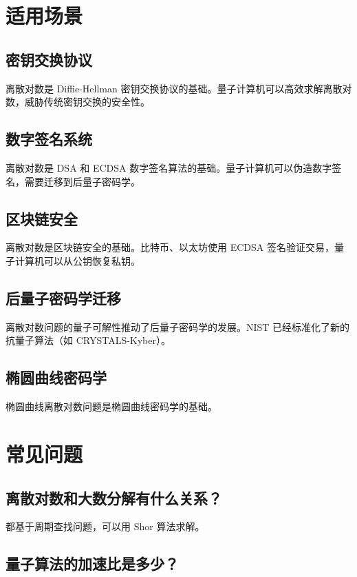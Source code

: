 \documentclass[12pt,a4paper]{article}
\begin{document}
\section{适用场景}

\subsection{密钥交换协议}

离散对数是 Diffie-Hellman 密钥交换协议的基础。量子计算机可以高效求解离散对数，威胁传统密钥交换的安全性。

\subsection{数字签名系统}

离散对数是 DSA 和 ECDSA 数字签名算法的基础。量子计算机可以伪造数字签名，需要迁移到后量子密码学。

\subsection{区块链安全}

离散对数是区块链安全的基础。比特币、以太坊使用 ECDSA 签名验证交易，量子计算机可以从公钥恢复私钥。

\subsection{后量子密码学迁移}

离散对数问题的量子可解性推动了后量子密码学的发展。NIST 已经标准化了新的抗量子算法（如 CRYSTALS-Kyber）。

\subsection{椭圆曲线密码学}

椭圆曲线离散对数问题是椭圆曲线密码学的基础。

\section{常见问题}

\subsection{离散对数和大数分解有什么关系？}

都基于周期查找问题，可以用 Shor 算法求解。

\subsection{量子算法的加速比是多少？}
\end{document}
